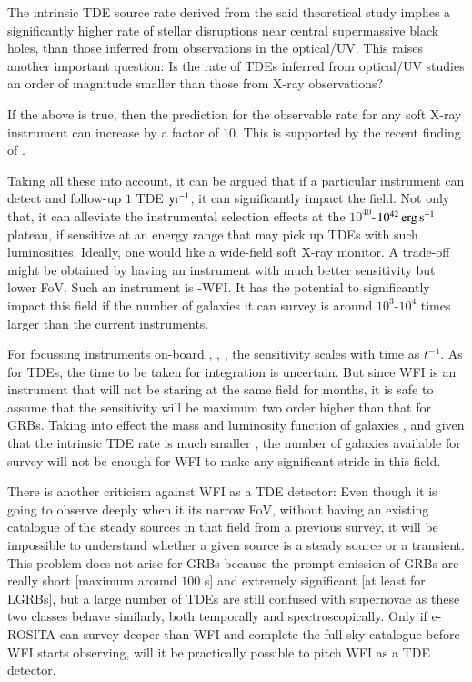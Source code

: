 The intrinsic TDE source rate derived from the said theoretical study implies a significantly higher rate of stellar disruptions near central supermassive black holes, than those inferred from observations in the optical/UV. This raises another important question: Is the rate of TDEs inferred from optical/UV studies an order of magnitude smaller than those from X-ray observations?

If the above is true, then the prediction for the observable rate for any soft X-ray instrument can increase by a factor of $10$. This is supported by the recent finding of \cite{Tadhunter_et_al.-2017-NatAst}.

Taking all these into account, it can be argued that if a particular instrument can detect and follow-up $1$ TDE ${\rm yr^{-1}}$, it can significantly impact the field. Not only that, it can alleviate the instrumental selection effects at the $10^{40}$-$10^{42} \, \rm erg \, s^{-1}$ plateau, if sensitive at an energy range that may pick up TDEs with such luminosities. Ideally, one would like a wide-field soft X-ray monitor. A trade-off might be obtained by having an instrument with much better sensitivity but lower FoV. Such an instrument is \A -WFI. It has the potential to significantly impact this field if the number of galaxies it can survey is around $10^3$-$10^4$ times larger than the current instruments.

For focussing instruments on-board \X, \C, \A, the sensitivity scales with time as $t^{-1}$. As for TDEs, the time to be taken for integration is uncertain. But since WFI is an instrument that will not be staring at the same field for months, it is safe to assume that the sensitivity will be maximum two order higher than that for GRBs. Taking into effect the mass and luminosity function of galaxies \citep{Conselice_et_al.-2016-ApJ}, and given that the intrinsic TDE rate is much smaller \citep{Auchettl_et_al.-2018-ApJ}, the number of galaxies available for survey will not be enough for WFI to make any significant stride in this field.

There is another criticism against WFI as a TDE detector: Even though it is going to observe deeply when it its narrow FoV, without having an existing catalogue of the steady sources in that field from a previous survey, it will be impossible to understand whether a given source is a steady source or a transient. This problem does not arise for GRBs because the prompt emission of GRBs are really short [maximum around $100$ s] and extremely significant [at least for LGRBs], but a large number of TDEs are still confused with supernovae as these two classes behave similarly, both temporally and spectroscopically. Only if e-ROSITA can survey deeper than WFI and complete the full-sky catalogue before WFI starts observing, will it be practically possible to pitch WFI as a TDE detector.

